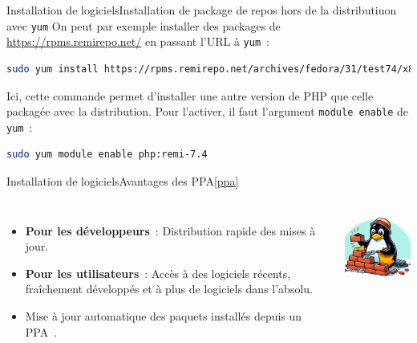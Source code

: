\documentclass{beamer}
\begin{document}
    \begin{frame}[fragile]{Installation de logiciels}{Installation de package de repos hors de la distributiuon avec \lstinline{yum}}
        On peut par exemple installer des packages de \url{https://rpms.remirepo.net/} en passant l'URL à \lstinline{yum}~:
        \begin{lstlisting}[language=bash]
sudo yum install https://rpms.remirepo.net/archives/fedora/31/test74/x86_64/php-fpm-7.4.15~RC2-1.fc31.remi.x86_64.rpm
        \end{lstlisting}
        Ici, cette commande permet d'installer une autre version de PHP que celle packagée avec la distribution.
        \bigbreak
        Pour l'activer, il faut l'argument \lstinline{module enable} de \lstinline{yum}~:
        \begin{lstlisting}[language=bash]
sudo yum module enable php:remi-7.4
        \end{lstlisting}
    \end{frame}

    \begin{frame}{Installation de logiciels}{Avantages des PPA\cref{ppa}}
        \begin{columns}
            \begin{itemize}
                \item \textbf{Pour les développeurs}~: Distribution rapide des mises à jour.
                \item \textbf{Pour les utilisateurs}~: Accès à des logiciels récents, fraîchement développés et à plus de logiciels dans l'absolu.
                \item Mise à jour automatique des paquets installés depuis un PPA~.
            \end{itemize}
            \centering
            \includegraphics[width=4cm]{image/tux-adding-brick}
        \end{columns}
    \end{frame}
\end{document}
